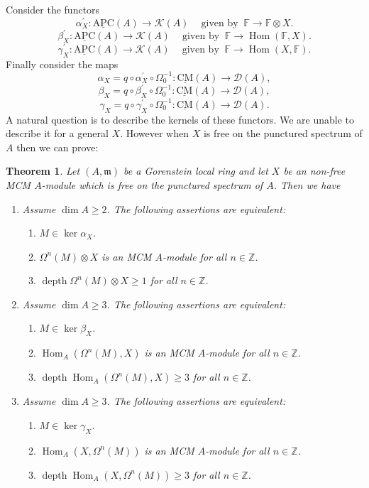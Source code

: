 \documentclass{amsart}
\newcommand{\D}{\mathcal{D} }
\newcommand{\m}{\mathfrak{m} }
\newcommand{\Z}{\mathbb{Z} }
\newcommand{\Kc}{\mathcal{K} }
\newcommand{\Fb}{\mathbb{F} }
\newcommand{\rt}{\rightarrow}
\newcommand{\depth}{\operatorname{depth}}
\newcommand{\CMS}{\operatorname{\underline{CM}}}
\newcommand{\Hom}{\operatorname{Hom}}
\newcommand{\apc}{\operatorname{\underline{APC}}}
\theoremstyle{plain}
\newtheorem{theorem}{Theorem}[section]
\theoremstyle{definition}
\theoremstyle{remark}
\begin{document}
{Consider the functors
$$ \alpha_X^\prime \colon \apc(A) \rt \Kc(A) \ \quad \text{given by }  \ \mathbb{F} \rt \Fb\otimes X.$$
$$ \beta_X^\prime \colon \apc(A) \rt \Kc(A) \ \quad \text{given by }  \ \mathbb{F} \rt \Hom(\Fb,  X).$$
$$ \gamma_X^\prime \colon \apc(A) \rt \Kc(A) \ \quad \text{given by }  \ \mathbb{F} \rt \Hom(X, \Fb).$$
Finally consider the maps
$$\alpha_X = q \circ \alpha^\prime_X \circ \Omega_0^{-1}  \colon \CMS(A) \rt \D(A), $$
$$\beta_X = q \circ \beta^\prime_X \circ \Omega_0^{-1}  \colon \CMS(A) \rt \D(A), $$
$$\gamma_X = q \circ \gamma^\prime_X \circ \Omega_0^{-1}  \colon \CMS(A) \rt \D(A).$$
A natural question is to describe the kernels of these functors. We are unable to describe it for a general $X$. However when $X$ is free on the punctured spectrum of $A$ then we can prove:
\begin{theorem}
\label{tate} Let $(A,\m)$ be a Gorenstein local ring and let $X$ be an non-free MCM $A$-module which is free on the punctured spectrum of $A$. Then we have
\begin{enumerate}[\rm (1)]
\item
Assume $\dim A \geq 2$. The following assertions are equivalent:
\begin{enumerate}[\rm (i)]
\item
$M \in \ker \alpha_X$.
\item
$\Omega^n(M)\otimes X$ is an MCM $A$-module for all $n \in \Z$.
\item
$\depth \Omega^n(M)\otimes X  \geq 1$ for all $n \in \Z$.
\end{enumerate}
\item
Assume $\dim A \geq 3$. The following assertions are equivalent:
\begin{enumerate}[\rm (i)]
\item
$M \in \ker \beta_X$.
\item
$\Hom_A(\Omega^n(M),  X)$ is an MCM $A$-module for all $n \in \Z$.
\item
$\depth \Hom_A(\Omega^n(M),  X) \geq 3$ for all $n \in \Z$.
\end{enumerate}
\item
Assume $\dim A \geq 3$. The following assertions are equivalent:
\begin{enumerate}[\rm (i)]
\item
$M \in \ker \gamma_X$.
\item
$\Hom_A(X, \Omega^n(M))$ is an MCM $A$-module for all $n \in \Z$.
\item
$\depth \Hom_A(X, \Omega^n(M)) \geq 3$ for all $n \in \Z$.
\end{enumerate}
\end{enumerate}
\end{theorem}

}
\end{document}
